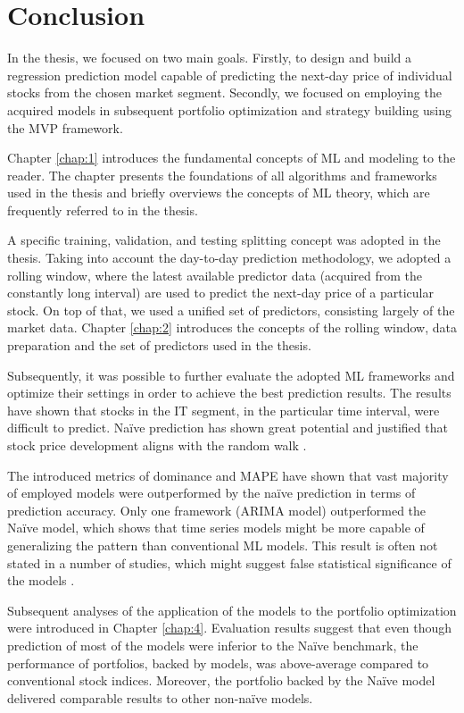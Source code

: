 \chapter*{Conclusion} 

In the thesis, we focused on two main goals. Firstly, to design and build a regression prediction model capable of predicting the next-day price
of individual stocks from the chosen market segment. Secondly, we focused on employing the acquired models in subsequent portfolio optimization 
and strategy building using the MVP framework.

Chapter \ref{chap:1} introduces the fundamental concepts of ML and modeling to the reader. The chapter presents the foundations of all algorithms and frameworks used in the thesis
and briefly overviews the concepts of ML theory, which are frequently referred to in the thesis.

A specific training, validation, and testing splitting concept was adopted in the thesis. Taking into account the day-to-day prediction methodology, we adopted a rolling window, where 
the latest available predictor data (acquired from the constantly long interval) are used to predict the next-day price of a particular stock. On top of that, we used a unified set of predictors, consisting 
largely of the market data. Chapter \ref{chap:2} introduces the concepts of the rolling window, data preparation and the set of predictors used in the thesis.

Subsequently, it was possible to further evaluate the adopted ML frameworks and optimize their settings in order to achieve the best prediction results. The results have shown that stocks in the IT segment,
in the particular time interval, were difficult to predict. Naïve prediction has shown great potential and justified that stock price development aligns with the random walk \cite{fama1970efficient}. 

The introduced metrics of dominance and MAPE have shown that vast majority of employed models were outperformed by the naïve prediction in terms of prediction accuracy.
Only one framework (ARIMA model) outperformed the Naïve model, which shows that time series models might be more capable of generalizing the pattern than conventional ML models.
This result is often not stated in a number of studies, which might suggest false statistical significance of the models \cite{krauss, konferencia1}.

Subsequent analyses of the application of the models to the portfolio optimization were introduced in Chapter \ref{chap:4}. Evaluation results suggest that even though prediction of most of the models were inferior to the Naïve benchmark,
the performance of portfolios, backed by models, was above-average compared to conventional stock indices. Moreover, the portfolio backed by the Naïve model delivered comparable results to other non-naïve models.

